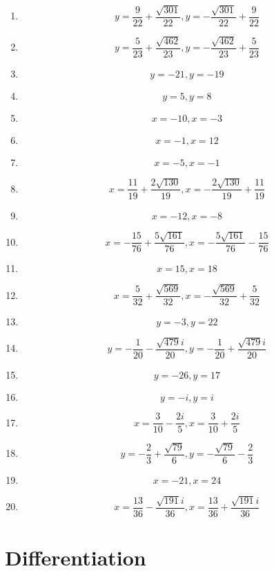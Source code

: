 \documentclass{article}
\begin{document}
        \begin{enumerate}
        \item$$y = \frac{9}{22} + \frac{\sqrt{301}}{22}, y = - \frac{\sqrt{301}}{22} + \frac{9}{22}$$
\item$$y = \frac{5}{23} + \frac{\sqrt{462}}{23}, y = - \frac{\sqrt{462}}{23} + \frac{5}{23}$$
\item$$y = -21, y = -19$$
\item$$y = 5, y = 8$$
\item$$x = -10, x = -3$$
\item$$x = -1, x = 12$$
\item$$x = -5, x = -1$$
\item$$x = \frac{11}{19} + \frac{2 \sqrt{130}}{19}, x = - \frac{2 \sqrt{130}}{19} + \frac{11}{19}$$
\item$$x = -12, x = -8$$
\item$$x = - \frac{15}{76} + \frac{5 \sqrt{161}}{76}, x = - \frac{5 \sqrt{161}}{76} - \frac{15}{76}$$
\item$$x = 15, x = 18$$
\item$$x = \frac{5}{32} + \frac{\sqrt{569}}{32}, x = - \frac{\sqrt{569}}{32} + \frac{5}{32}$$
\item$$y = -3, y = 22$$
\item$$y = - \frac{1}{20} - \frac{\sqrt{479} i}{20}, y = - \frac{1}{20} + \frac{\sqrt{479} i}{20}$$
\item$$y = -26, y = 17$$
\item$$y = - i, y = i$$
\item$$x = \frac{3}{10} - \frac{2 i}{5}, x = \frac{3}{10} + \frac{2 i}{5}$$
\item$$y = - \frac{2}{3} + \frac{\sqrt{79}}{6}, y = - \frac{\sqrt{79}}{6} - \frac{2}{3}$$
\item$$x = -21, x = 24$$
\item$$x = \frac{13}{36} - \frac{\sqrt{191} i}{36}, x = \frac{13}{36} + \frac{\sqrt{191} i}{36}$$
        \end{enumerate}
        

        \section{Differentiation}
        
\end{document}
